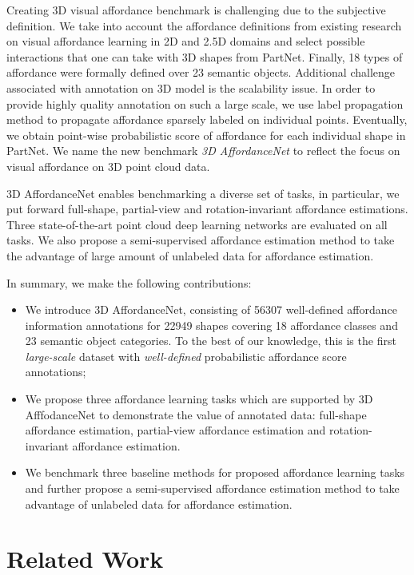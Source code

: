 \documentclass[final]{cvpr}
\begin{document}
Creating 3D visual affordance benchmark is challenging due to the subjective definition. We take into account the affordance definitions from existing research on visual affordance learning in 2D and 2.5D domains \cite{hassanin2018visual} and select possible interactions that one can take with 3D shapes from PartNet. Finally, 18 types of affordance were formally defined over 23 semantic objects. Additional challenge associated with annotation on 3D model is the scalability issue. In order to provide highly quality annotation on such a large scale, we use label propagation method to propagate affordance sparsely labeled on individual points. Eventually, we obtain point-wise probabilistic score of affordance for each individual shape in PartNet. We name the new benchmark \textit{3D AffordanceNet} to reflect the focus on visual affordance on 3D point cloud data.

3D AffordanceNet enables benchmarking a diverse set of tasks, in particular, we put forward full-shape, partial-view and rotation-invariant affordance estimations. Three state-of-the-art point cloud deep learning networks are evaluated on all tasks. We also propose a semi-supervised affordance estimation method to take the advantage of large amount of unlabeled data for affordance estimation.






In summary, we make the following contributions:
\begin{itemize}
   \item We introduce 3D AffordanceNet, consisting of 56307 well-defined affordance
         information annotations for 22949 shapes covering 18 affordance classes and
         23 semantic object categories.
         To the best of our knowledge, this is the first \textit{large-scale} dataset with
         \textit{well-defined} probabilistic affordance score annotations;
   \item We propose three affordance learning tasks which are supported by 3D AfffodanceNet
         to demonstrate the value of annotated data: full-shape affordance estimation, partial-view affordance estimation and rotation-invariant affordance estimation.
   \item We benchmark three baseline methods for proposed affordance learning tasks and further propose a semi-supervised affordance estimation method to take advantage of unlabeled data for affordance estimation. 
\end{itemize}
\section{Related Work}
\end{document}
